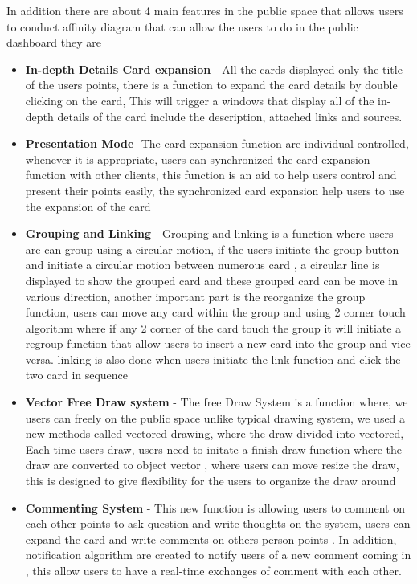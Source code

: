 \documentclass{sigchi}
\begin{document}
\begin{itemize}
In addition there are about 4 main features in the public space that allows users to conduct affinity diagram  that can allow the users to do in the public dashboard they are 

\begin{itemize}


\item  \textbf{In-depth Details Card expansion}   - All the cards displayed only the title of the users points, there is a function to expand the card details by double clicking on the card, This will trigger a windows that display all of the in-depth details of the card include the description, attached links and sources. 
\item  \textbf{Presentation Mode} -The card expansion function are individual controlled, whenever it is appropriate, users can synchronized the card expansion function with other clients, this function is an aid to help users control and present their points easily, the synchronized card expansion help users to use the expansion of the card 
\item \textbf{Grouping and Linking} -  Grouping and linking is a function where users are can group using a circular motion, if the users initiate the group button and initiate a circular motion between numerous card , a circular line is displayed to show the grouped card and these grouped card can be move in various direction, another important part is the reorganize the group function, users can move any card within the group and using 2 corner touch algorithm where if any 2 corner of the card touch the group it will initiate  a regroup function that allow users to insert a new card into the group and vice versa. linking is also done when users initiate the link function and click the two card in sequence  
\item \textbf{Vector Free Draw system} - The free Draw System is a function where, we users can freely on the public space unlike typical drawing system, we used a new methods called vectored drawing, where the draw divided into vectored, Each time users draw, users need to initate a finish draw function where the draw are converted to object vector , where users can move resize the draw, this is designed to give flexibility for the users to organize the draw around 
\item \textbf{Commenting System} - This new function is allowing users to comment on each other points to ask question and write  thoughts on the system, users can expand the card and write comments on others person points . In addition, notification algorithm are created to notify users of a new comment coming in , this allow users to have a real-time exchanges of comment with each other. 




\end{itemize}
\end{itemize}
\end{document}
